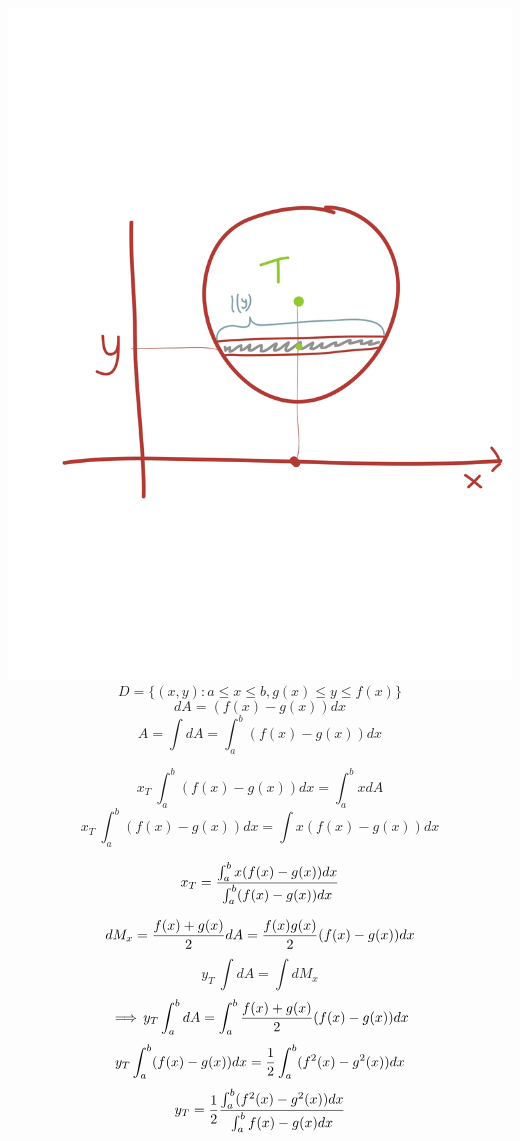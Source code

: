 \documentclass{article}
\begin{document}
\subsection{}
\includegraphics[scale=0.15]{img/img8.jpg}
$$ D=\{ (x,y) : a\le x\le b, g(x)\le y\le f(x) \} $$
$$ dA = (f(x) - g(x)) dx $$
$$ A=\int dA = \int^b_a (f(x) - g(x)) dx $$

$$ x_T\ \int^b_a(f(x)-g(x)) dx = \int^b_a xdA $$
$$ x_T\ \int^b_a(f(x)-g(x)) dx = \int x(f(x) - g(x)) dx $$

$$ x_T=\frac{\int^b_a x(f(x) - g(x)) dx}{\int^b_a (f(x) - g(x)) dx}$$


$$ dM_x =\frac{f(x)+g(x)}{2}dA = \frac{f(x)g(x)}{2}(f(x) - g(x)) dx  $$
$$ y_T\ \int dA = \int dM_x $$
$$ \operatorname{\implies} y_T \int^b_a dA = \int^b_a{\frac{f(x) + g(x)}{2} (f(x) - g(x)) dx } $$
$$ y_T \int^b_a(f(x) - g(x)) dx = \frac{1}{2} \int^b_a(f^2(x) - g^2(x)) dx $$
$$ y_T = \frac{1}{2} \frac{\int^b_a(f^2(x) - g^2(x)) dx}{\int^b_a{f(x) - g(x) dx}} $$
\end{document}
